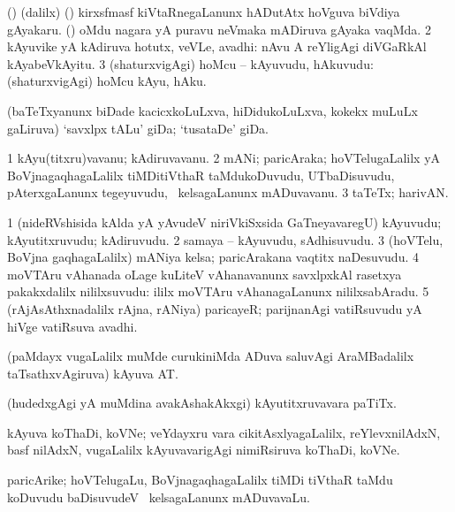 \bentry
{} 
\gl{\nA}
\expl{}
\bmng
\bnum
{} (\birx) (\bava dalilx) 
\banum
{} (\pArxparx) kirxsfmasf kiVtaRnegaLanunx hADutAtx hoVguva biVdiya gAyakaru. 
 (\ca) oMdu nagara yA puravu neVmaka mADiruva gAyaka vaqMda. 
\eanum
\numie
\num{2} kAyuvike yA kAdiruva hotutx, veVLe, avadhi:  nAvu A reYligAgi diVGaRkAl kAyabeVkAyitu. 
\num{3} (shaturxvigAgi) hoMcu -- kAyuvudu, hAkuvudu:  (shaturxvigAgi) hoMcu kAyu, hAku. 
\enum
\emng
\eentry

\bentry
{} 
\gl{\nA}
\expl{}
\bmng
(baTeTxyanunx biDade kacicxkoLuLxva, hiDidukoLuLxva, kokekx muLuLx gaLiruva) `savxlpx tALu' giDa; `tusataDe' giDa. 
\emng
\eentry

\bentry
{} 
\gl{\nA}
\bmng
\bnum
\num{1} kAyu(titxru)vavanu; kAdiruvavanu. 
\num{2} mANi; paricAraka; hoVTelugaLalilx yA BoVjnagaqhagaLalilx tiMDitiVthaR taMdukoDuvudu, UTbaDisuvudu, pAterxgaLanunx tegeyuvudu, \mo\ kelsagaLanunx mADuvavanu. 
\num{3} taTeTx; harivAN. 
\enum
\emng
\eentry

\bentry
{} 
\gl{\nA}
\bmng
\bnum
\num{1} (nideRVshisida kAlda yA yAvudeV niriVkiSxsida GaTneyavaregU) kAyuvudu; kAyutitxruvudu; kAdiruvudu. 
\num{2} samaya -- kAyuvudu, sAdhisuvudu. 
\num{3} (hoVTelu, BoVjna gaqhagaLalilx) mANiya kelsa; paricArakana vaqtitx naDesuvudu. 
\num{4} moVTAru vAhanada oLage kuLiteV vAhanavanunx savxlpxkAl rasetxya pakakxdalilx nililxsuvudu:  ililx moVTAru vAhanagaLanunx nililxsabAradu. 
\num{5} (rAjAsAthxnadalilx rAjna, rANiya) paricayeR; parijnanAgi vatiRsuvudu yA hiVge vatiRsuva avadhi. 
\enum
\emng
\eentry

\bentry
{}
\gl{\nA}
\expl{}
\bmng
(paMdayx \mo vugaLalilx muMde curukiniMda ADuva saluvAgi AraMBadalilx taTsathxvAgiruva) kAyuva AT. 
\emng
\eentry

\bentry
{} 
\gl{\nA}
\expl{}
\bmng
(hudedxgAgi yA muMdina avakAshakAkxgi) kAyutitxruvavara paTiTx. 
\emng
\eentry

\bentry
{} 
\gl{\nA}
\expl{}
\bmng
kAyuva koThaDi, koVNe; veYdayxru \mo vara cikitAsxlyagaLalilx, reYlevxnilAdxN, basf nilAdxN, \mo vugaLalilx kAyuvavarigAgi nimiRsiruva koThaDi, koVNe. 
\emng
\eentry

\bentry
{} 
\gl{\nA}
\bmng
paricArike; hoVTelugaLu, BoVjnagaqhagaLalilx tiMDi tiVthaR taMdu koDuvudu baDisuvudeV \mo\ kelsagaLanunx mADuvavaLu. 
\emng
\eentry

